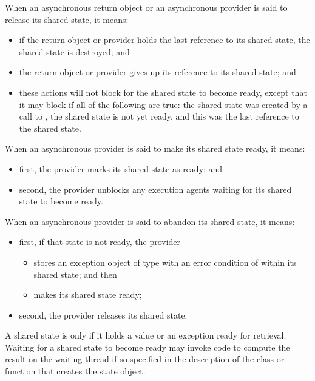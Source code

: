 \pnum
When an asynchronous return object or an asynchronous provider is said to release its
shared state, it means:

\begin{itemize}
\item
if the return object or provider holds the last reference to its shared state,
the shared state is destroyed; and

\item
the return object or provider gives up its reference to its shared state; and

\item these actions will not block for the shared state to become ready, except that it
may block if all of the following are true: the shared state was created by a call to
, the shared state is not yet ready, and this was the last reference
to the shared state.
\end{itemize}

\pnum
When an asynchronous provider is said to make its shared state ready, it means:

\begin{itemize}
\item
first, the provider marks its shared state as ready; and

\item
second, the provider unblocks any execution agents waiting for its shared
state to become ready.
\end{itemize}

\pnum
When an asynchronous provider is said to abandon its shared state, it means:

\begin{itemize}
\item
first, if that state is not ready, the provider

\begin{itemize}
\item
stores an exception object of type  with an error condition of
 within its shared state; and then

\item
makes its shared state ready;
\end{itemize}

\item
second, the provider releases its shared state.
\end{itemize}

\pnum
A shared state is  only if it holds a value or an exception ready for
retrieval.
Waiting for a shared state to become ready may invoke code to compute the result on 
the waiting thread if so specified in the description of the class or function that creates
the state object.

